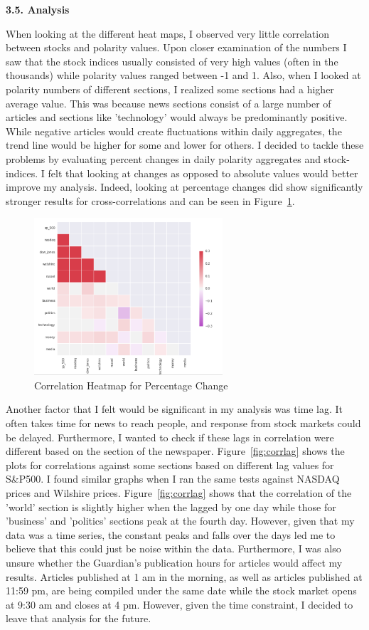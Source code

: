 \documentclass{acm_proc_article-sp}
\begin{document}
\textbf{3.5. Analysis }


When looking at the different heat maps, I observed very little correlation between stocks and polarity values. Upon closer examination of the numbers I saw that the stock indices usually consisted of very high values (often in the thousands) while polarity values ranged between -1 and 1. Also, when I looked at polarity numbers of different sections, I realized some sections had a higher average value. This was because news sections consist of a large number of articles and sections like 'technology' would always be predominantly positive. While negative articles would create fluctuations within daily aggregates, the trend line would be higher for some and lower for others. I decided to tackle these problems by evaluating percent changes in daily polarity aggregates and stock-indices. I felt that looking at changes as opposed to absolute values would better improve my analysis. Indeed, looking at percentage changes did show significantly stronger results for cross-correlations and can be seen in Figure~\ref{fig:corr2}. 

\begin{figure}[h]
\includegraphics[width=7cm]{figures/improved_corr.png}
\caption{Correlation Heatmap for Percentage Change}
\label{fig:corr2}
\end{figure}

Another factor that I felt would be significant in my analysis was time lag. It often takes time for news to reach people, and response from stock markets could be delayed. Furthermore, I wanted to check if these lags in correlation were different based on the section of the newspaper. Figure~\ref{fig:corrlag} shows the plots for correlations against some sections based on different lag values for S&P500. I found similar graphs when I ran the same tests against NASDAQ prices and Wilshire prices. Figure~\ref{fig:corrlag} shows that the correlation of the 'world' section is slightly higher when the lagged by one day while those for 'business' and 'politics' sections peak at the fourth day. However, given that my data was a time series, the constant peaks and falls over the days led me to believe that this could just be noise within the data. Furthermore, I was also unsure whether the Guardian's publication hours for articles would affect my results. Articles published at 1 am in the morning, as well as articles published at 11:59 pm, are being compiled under the same date while the stock market opens at 9:30 am and closes at 4 pm. However, given the time constraint, I decided to leave that analysis for the future.
\end{document}
